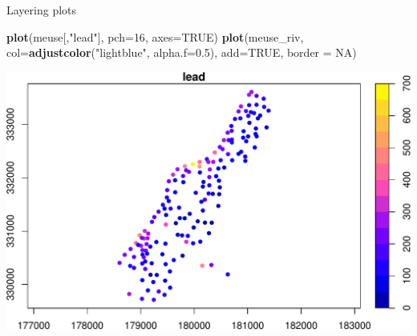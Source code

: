\documentclass[11pt,ignorenonframetext,]{beamer}
\newenvironment{Shaded}{}{}
\newcommand{\DataTypeTok}[1]{\textcolor[rgb]{0.56,0.13,0.00}{#1}}
\newcommand{\DecValTok}[1]{\textcolor[rgb]{0.25,0.63,0.44}{#1}}
\newcommand{\FloatTok}[1]{\textcolor[rgb]{0.25,0.63,0.44}{#1}}
\newcommand{\KeywordTok}[1]{\textcolor[rgb]{0.00,0.44,0.13}{\textbf{#1}}}
\newcommand{\NormalTok}[1]{#1}
\newcommand{\OtherTok}[1]{\textcolor[rgb]{0.00,0.44,0.13}{#1}}
\newcommand{\StringTok}[1]{\textcolor[rgb]{0.25,0.44,0.63}{#1}}
\let\oldShaded\Shaded
\let\endoldShaded\endShaded
\renewenvironment{Shaded}{\footnotesize\begin{spacing}{0.9}\oldShaded}{\endoldShaded\end{spacing}}
\let\oldverbatim\verbatim
\let\endoldverbatim\endverbatim
\newcommand{\scriptoutput}{
  \renewenvironment{Shaded}{\scriptsize\begin{spacing}{0.9}\oldShaded}{\endoldShaded\end{spacing}}
  \renewenvironment{verbatim}{\scriptsize\begin{spacing}{0.9}\oldverbatim}{\endoldverbatim\end{spacing}}
}
\begin{document}
\begin{frame}[fragile,t]{Layering plots}
\protect\hypertarget{layering-plots}{}

\scriptoutput

\begin{Shaded}
\begin{Highlighting}[]
\KeywordTok{plot}\NormalTok{(meuse[,}\StringTok{"lead"}\NormalTok{], }\DataTypeTok{pch=}\DecValTok{16}\NormalTok{, }\DataTypeTok{axes=}\OtherTok{TRUE}\NormalTok{)}
\KeywordTok{plot}\NormalTok{(meuse_riv, }\DataTypeTok{col=}\KeywordTok{adjustcolor}\NormalTok{(}\StringTok{"lightblue"}\NormalTok{, }\DataTypeTok{alpha.f=}\FloatTok{0.5}\NormalTok{), }\DataTypeTok{add=}\OtherTok{TRUE}\NormalTok{, }\DataTypeTok{border =} \OtherTok{NA}\NormalTok{)}
\end{Highlighting}
\end{Shaded}

\begin{center}\includegraphics[width=\textwidth]{Lec16_files/figure-beamer/unnamed-chunk-11-1} \end{center}

\end{frame}
\end{document}

